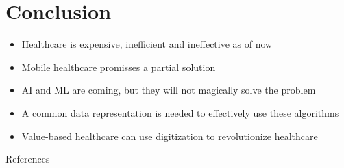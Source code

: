 \documentclass[xcolor=dvipsnames, aspectratio=1610]{beamer}
\begin{document}
\section{Conclusion}%
\label{sec:conclusion}

\begin{frame}{\secname}
    \begin{itemize}[<+->]
        \item Healthcare is expensive, inefficient and ineffective as of now
        \item Mobile healthcare promisses a partial solution
        \item AI and ML are coming, but they will not magically solve the problem
        \item A common data representation is needed to effectively use these algorithms
        \item Value-based healthcare can use digitization to revolutionize healthcare
    \end{itemize}
\end{frame}


\begin{frame}[allowframebreaks]{References}
    
    
\end{frame}
\end{document}
